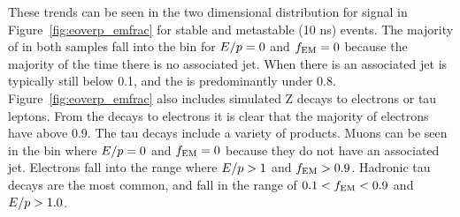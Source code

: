 These trends can be seen in the two dimensional distribution for signal in Figure~\ref{fig:eoverp_emfrac} for stable and metastable (10 ns) events.
The majority of \rhadrons in both samples fall into the bin for $E/p = 0$ and $f_\mathrm{EM} = 0$ because the majority of the time there is no associated jet. 
When there is an associated jet \ep is typically still below 0.1, and the \emfrac is predominantly under 0.8.
Figure~\ref{fig:eoverp_emfrac} also includes simulated Z decays to electrons or tau leptons.
From the decays to electrons it is clear that the majority of electrons have \emfrac above 0.9.
The tau decays include a variety of products.
Muons can be seen in the bin where $E/p = 0$ and $f_\mathrm{EM} = 0$ because they do not have an associated jet.
Electrons fall into the range where $E/p > 1$ and $f_\mathrm{EM} > 0.9$.
Hadronic tau decays are the most common, and fall in the range of $0.1 < f_\mathrm{EM} < 0.9$ and $E/p > 1.0$. 

